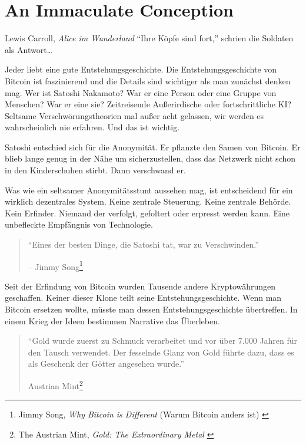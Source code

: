 \chapter{An Immaculate Conception}
\label{les:5}

\begin{chapquote}{Lewis Carroll, \textit{Alice im Wunderland}}
\enquote{Ihre Köpfe sind fort,} schrien die Soldaten als Antwort\ldots
\end{chapquote}

Jeder liebt eine gute Entstehungsgeschichte. Die Entstehungsgeschichte von
Bitcoin ist faszinierend und die Details sind wichtiger als man zunächst denken
mag. Wer ist Satoshi Nakamoto? War er eine Person oder eine Gruppe von Menschen?
War er eine sie? Zeitreisende Außerirdische oder fortschrittliche KI? Seltsame
Verschwörungstheorien mal außer acht gelassen, wir werden es wahrscheinlich nie
erfahren. Und das ist wichtig.

Satoshi entschied sich für die Anonymität. Er pflanzte den Samen von Bitcoin. Er
blieb lange genug in der Nähe um sicherzustellen, dass das Netzwerk nicht schon
in den Kinderschuhen stirbt. Dann verschwand er.

Was wie ein seltsamer Anonymitätsstunt aussehen mag, ist entscheidend für ein
wirklich dezentrales System. Keine zentrale Steuerung. Keine zentrale Behörde.
Kein Erfinder. Niemand der verfolgt, gefoltert oder erpresst werden kann. Eine
unbefleckte Empfängnis von Technologie.

\begin{quotation}\begin{samepage}
\enquote{Eines der besten Dinge, die Satoshi tat, war zu Verschwinden.}
\begin{flushright} -- Jimmy Song\footnote{Jimmy Song, \textit{Why Bitcoin is Different} (Warum Bitcoin anders ist) \cite{bitcoin-different}}
\end{flushright}\end{samepage}\end{quotation}

\newpage

Seit der Erfindung von Bitcoin wurden Tausende andere Kryptowährungen
geschaffen. Keiner dieser Klone teilt seine Entstehungsgeschichte. Wenn man
Bitcoin ersetzen wollte, müsste man dessen Entstehungsgeschichte übertreffen. In
einem Krieg der Ideen bestimmen Narrative das Überleben.

\begin{quotation}\begin{samepage}
\enquote{Gold wurde zuerst zu Schmuck verarbeitet und vor über 7.000 Jahren für
den Tausch verwendet. Der fesselnde Glanz von Gold führte dazu, dass es als
Geschenk der Götter angesehen wurde.}
\begin{flushright} Austrian Mint\footnote{The Austrian Mint, \textit{Gold: The Extraordinary Metal} \cite{gold-gift-gods}}
\end{flushright}\end{samepage}\end{quotation}

